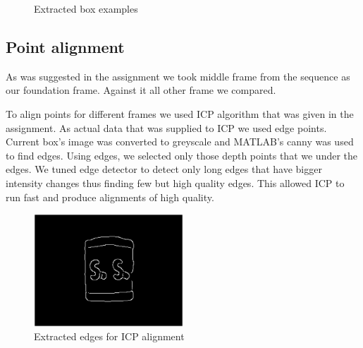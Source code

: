 \documentclass{article}
\begin{document}
\begin{figure}[h!]
    \centering
      \caption{Extracted box examples}
\end{figure}

\subsection{Point alignment}
As was suggested in the assignment we took middle frame
from the sequence as our foundation frame. Against it all
other frame we compared.

To align points for different frames we used ICP algorithm
that was given in the assignment. As actual data that was 
supplied to ICP we used edge points. Current box's image
was converted to greyscale and MATLAB's canny was used
to find edges. Using edges, we selected only those
depth points that we under the edges. We tuned edge
detector to detect only long edges that have bigger
intensity changes thus finding few but high quality edges.
This allowed ICP to run fast and produce alignments
of high quality.

\begin{figure}[h!]
  \centering
  \includegraphics[width=0.5\textwidth]{figs/extracted_edge_mask}
  \caption{Extracted edges for ICP alignment}
  \label{fig:extracted_edge_mask}
\end{figure}
\end{document}
